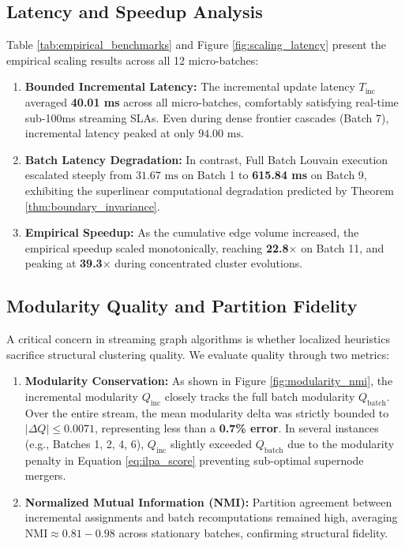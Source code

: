 \documentclass[10pt,journal,compsoc]{IEEEtran}
\begin{document}
\subsection{Latency and Speedup Analysis}
Table \ref{tab:empirical_benchmarks} and Figure \ref{fig:scaling_latency} present the empirical scaling results across all 12 micro-batches:
\begin{enumerate}
    \item \textbf{Bounded Incremental Latency:} The incremental update latency $T_{\text{inc}}$ averaged \textbf{40.01 ms} across all micro-batches, comfortably satisfying real-time sub-100ms streaming SLAs. Even during dense frontier cascades (Batch 7), incremental latency peaked at only $94.00\text{ ms}$.
    \item \textbf{Batch Latency Degradation:} In contrast, Full Batch Louvain execution escalated steeply from $31.67\text{ ms}$ on Batch 1 to \textbf{615.84 ms} on Batch 9, exhibiting the superlinear computational degradation predicted by Theorem \ref{thm:boundary_invariance}.
    \item \textbf{Empirical Speedup:} As the cumulative edge volume increased, the empirical speedup scaled monotonically, reaching \textbf{22.8$\times$} on Batch 11, and peaking at \textbf{39.3$\times$} during concentrated cluster evolutions.
\end{enumerate}

\subsection{Modularity Quality and Partition Fidelity}
A critical concern in streaming graph algorithms is whether localized heuristics sacrifice structural clustering quality. We evaluate quality through two metrics:
\begin{enumerate}
    \item \textbf{Modularity Conservation:} As shown in Figure \ref{fig:modularity_nmi}, the incremental modularity $Q_{\text{inc}}$ closely tracks the full batch modularity $Q_{\text{batch}}$. Over the entire stream, the mean modularity delta was strictly bounded to $|\Delta Q| \le 0.0071$, representing less than a \textbf{0.7\% error}. In several instances (e.g., Batches 1, 2, 4, 6), $Q_{\text{inc}}$ slightly exceeded $Q_{\text{batch}}$ due to the modularity penalty in Equation \eqref{eq:ilpa_score} preventing sub-optimal supernode mergers.
    \item \textbf{Normalized Mutual Information (NMI):} Partition agreement between incremental assignments and batch recomputations remained high, averaging $\text{NMI} \approx 0.81 - 0.98$ across stationary batches, confirming structural fidelity.
\end{enumerate}
\end{document}
